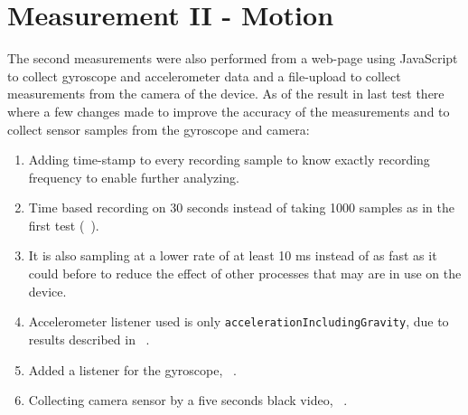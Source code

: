 \section{Measurement II - Motion}\label{sec:measurementII}
The second measurements were also performed from a web-page using JavaScript to collect gyroscope and accelerometer data and a file-upload to collect measurements from the camera of the device. As of the result in last test there where a few changes made to improve the accuracy of the measurements and to collect sensor samples from the gyroscope and camera:
\begin{enumerate}
  \item Adding time-stamp to every recording sample to know exactly recording frequency to enable further analyzing.
  \item Time based recording on 30 seconds instead of taking 1000 samples as in the first test (~).
  \item It is also sampling at a lower rate of at least 10 ms instead of as fast as it could before to reduce the effect of other processes that may are in use on the device.
  \item Accelerometer listener used is only \texttt{accelerationIncludingGravity}, due to results described in ~.
  \item Added a listener for the gyroscope, ~.
  \item Collecting camera sensor by a five seconds black video, ~.
\end{enumerate}


